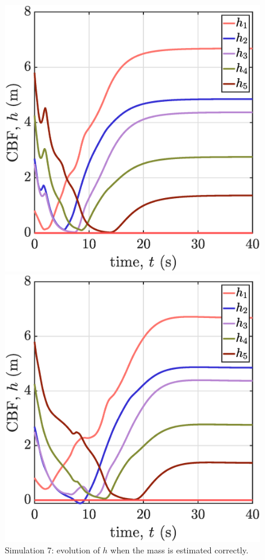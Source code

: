 \begin{figure}[p]
    \begin{minipage}[b]{0.46\linewidth}
    \includegraphics[width=\textwidth]{figures/sim7hm.eps}
    \caption{\label{fig:sim7hm}Simulation 7: evolution of $h$ when the mass is estimated correctly.\\ }
    \end{minipage}
    \hfill
    \begin{minipage}[b]{0.46\linewidth}
    \includegraphics[width=\textwidth]{figures/sim7h3.eps}

\end{minipage}
\end{figure}
